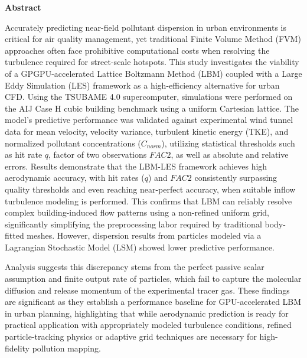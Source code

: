\begin{center}
    \textbf{\Huge Abstract} \\
    \vspace{0.4cm}
\end{center}

Accurately predicting near-field pollutant dispersion in urban environments is critical for air quality management, yet traditional Finite Volume Method (FVM) approaches often face prohibitive computational costs when resolving the turbulence required for street-scale hotspots. This study investigates the viability of a GPGPU-accelerated Lattice Boltzmann Method (LBM) coupled with a Large Eddy Simulation (LES) framework as a high-efficiency alternative for urban CFD. 
Using the TSUBAME 4.0 supercomputer, simulations were performed on the AIJ Case H cubic building benchmark using a uniform Cartesian lattice. The model's predictive performance was validated against experimental wind tunnel data for mean velocity, velocity variance, turbulent kinetic energy (TKE), and normalized pollutant concentrations ($C_{norm}$), utilizing statistical thresholds such as hit rate $q$, factor of two observations $FAC2$, as well as absolute and relative errors. 
Results demonstrate that the LBM-LES framework achieves high aerodynamic accuracy, with hit rates ($q$) and $FAC2$ consistently surpassing quality thresholds and even reaching near-perfect accuracy, when suitable inflow turbulence modeling is performed. This confirms that LBM can reliably resolve complex building-induced flow patterns using a non-refined uniform grid, significantly simplifying the preprocessing labor required by traditional body-fitted meshes. However, dispersion results from particles modeled via a Lagrangian Stochastic Model (LSM) showed lower predictive performance.

Analysis suggests this discrepancy stems from the perfect passive scalar assumption and finite output rate of particles, which fail to capture the molecular diffusion and release momentum of the experimental tracer gas. These findings are significant as they establish a performance baseline for GPU-accelerated LBM in urban planning, highlighting that while aerodynamic prediction is ready for practical application with appropriately modeled turbulence conditions, refined particle-tracking physics or adaptive grid techniques are necessary for high-fidelity pollution mapping.

\newpage

